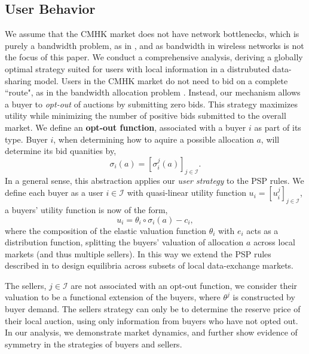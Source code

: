 \documentclass[12pt]{article}
\theoremstyle{definition}
\newcommand{\mcI}{\mathcal{I}}
\newcommand{\g}{\sigma}
\begin{document}
\begin{multicols}{2}
\subsection{User Behavior}

We assume that the CMHK market does not have network
bottlenecks, which is purely a bandwidth problem, as in \cite{semret}, and as
bandwidth in wireless networks is not the focus of this paper. We
conduct a comprehensive analysis, deriving a globally optimal strategy suited for
users with local information in a distrubuted data-sharing model. 
Users in the CMHK market do not need to bid on a complete ``route", as in the
bandwidth allocation problem \cite{semret}. Instead, our mechanism allows a buyer
to \emph{opt-out} of auctions by submitting zero bids. This strategy maximizes
utility while minimizing the number of positive bids submitted to the overall
market. We define an \textbf{opt-out function}, associated with a buyer $i$ as
part of its type. Buyer $i$, when determining how to aquire a possible allocation $a$,
will determine its bid quanities by,
\begin{equation}\label{opt-out}
    \g_i(a) = [\g_i^j(a)]_{j\in\mcI}.
\end{equation}
In a general sense, this abstraction applies our \emph{user strategy}
to the PSP rules.
We define each buyer as a user $i\in\mcI$ with quasi-linear utility
function $u_i = [u_i^j]_{j\in\mcI}$, a buyers' utility function is now of the form,
\begin{equation}\label{buyerutility}
    u_i = \theta_i \circ \g_i(a) - c_i,
\end{equation}
where the composition of the elastic valuation function $\theta_i$ with $e_i$ acts as a distribution function, splitting
the buyers' valuation of allocation $a$ across local markets (and thus multiple sellers).
In this way we extend the PSP rules described
in \cite{semret} to design equilibria across subsets of local data-exchange markets.

The sellers, $j\in\mcI$ are not associated with an opt-out function, we
consider their valuation to be a functional extension of the buyers, where
$\theta^j$ is constructed by buyer demand.
The sellers strategy can only be to determine the reserve price of their local
auction, using only information from buyers who have not opted out.
In our analysis, we demonstrate market dynamics, and further show evidence of symmetry in the strategies of
buyers and sellers.


\end{multicols}
\end{document}
